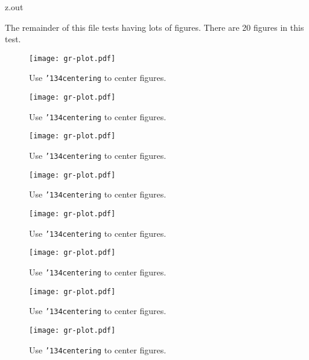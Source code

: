 \begin{VerbatimOut}{z.out}

\newpage

The remainder of this file tests having lots of figures.
There are 20 figures in this test.

\begin{figure}[ht]
  \centering
  \texttt{[image: gr-plot.pdf]}
  \caption{Use {\tt \char'134centering\/} to center figures.}
  \label{fi:centered}
\end{figure}

\begin{figure}[ht]
  \centering
  \texttt{[image: gr-plot.pdf]}
  \caption{Use {\tt \char'134centering\/} to center figures.}
  \label{fi:centered}
\end{figure}

\begin{figure}[ht]
  \centering
  \texttt{[image: gr-plot.pdf]}
  \caption{Use {\tt \char'134centering\/} to center figures.}
  \label{fi:centered}
\end{figure}

\begin{figure}[ht]
  \centering
  \texttt{[image: gr-plot.pdf]}
  \caption{Use {\tt \char'134centering\/} to center figures.}
  \label{fi:centered}
\end{figure}

\begin{figure}[ht]
  \centering
  \texttt{[image: gr-plot.pdf]}
  \caption{Use {\tt \char'134centering\/} to center figures.}
  \label{fi:centered}
\end{figure}

\begin{figure}[ht]
  \centering
  \texttt{[image: gr-plot.pdf]}
  \caption{Use {\tt \char'134centering\/} to center figures.}
  \label{fi:centered}
\end{figure}

\begin{figure}[ht]
  \centering
  \texttt{[image: gr-plot.pdf]}
  \caption{Use {\tt \char'134centering\/} to center figures.}
  \label{fi:centered}
\end{figure}

\begin{figure}[ht]
  \centering
  \texttt{[image: gr-plot.pdf]}
  \caption{Use {\tt \char'134centering\/} to center figures.}
  \label{fi:centered}
\end{figure}


\end{VerbatimOut}
